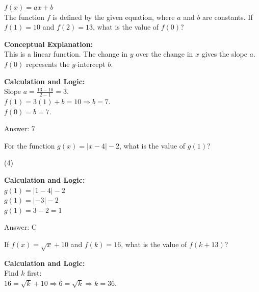 \documentclass[11pt,paper=a4,answers]{exam}
\begin{document}
\begin{questions}
\question
$f(x) = ax + b$ \\
The function $f$ is defined by the given equation, where $a$ and $b$ are constants. If $f(1) = 10$ and $f(2) = 13$, what is the value of $f(0)$?

\begin{solution}
\textbf{Conceptual Explanation:} \\
This is a linear function. The change in $y$ over the change in $x$ gives the slope $a$. $f(0)$ represents the $y$-intercept $b$.

\vspace{20pt}

\textbf{Calculation and Logic:} \\
Slope $a = \frac{13 - 10}{2 - 1} = 3$. \\
$f(1) = 3(1) + b = 10 \Rightarrow b = 7$. \\
$f(0) = b = 7$.

\vspace{25pt}

Answer: \colorbox{yellow!100}{7}
\end{solution}

\vspace{40pt}

\question
For the function $g(x) = |x-4| - 2$, what is the value of $g(1)$?
\begin{tasks}(4)
\end{tasks}

\begin{solution}
\textbf{Calculation and Logic:} \\
$g(1) = |1 - 4| - 2$ \\
$g(1) = |-3| - 2$ \\
$g(1) = 3 - 2 = 1$

\vspace{25pt}

Answer: \colorbox{yellow!100}{C}
\end{solution}

\vspace{40pt}

\question
If $f(x) = \sqrt{x} + 10$ and $f(k) = 16$, what is the value of $f(k+13)$?

\begin{solution}
\textbf{Calculation and Logic:} \\
Find $k$ first: \\
$16 = \sqrt{k} + 10 \Rightarrow 6 = \sqrt{k} \Rightarrow k = 36$.


\end{solution}
\end{questions}
\end{document}

